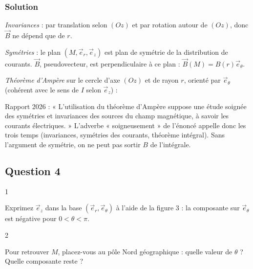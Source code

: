 \documentclass[11pt,a4paper]{article}
\newcommand{\equationajustee}[1]{%
  \sbox{\boiteequation}{$\displaystyle #1$}%
  \ifdim\wd\boiteequation>\linewidth
    \[\resizebox{\linewidth}{!}{\usebox{\boiteequation}}\]%
  \else
    \[#1\]%
  \fi}
\begin{document}
\hypertarget{solution-2}{%
\subsubsection{Solution}\label{solution-2}}

\emph{Invariances} : par translation selon \((Oz)\) et par rotation autour de \((Oz)\), donc \(\vec B\) ne dépend que de \(r\).

\emph{Symétries} : le plan \((M,\vec e_r,\vec e_z)\) est plan de symétrie de la distribution de courants. \(\vec B\), pseudovecteur, est perpendiculaire à ce plan : \(\vec B(M)=B(r)\vec e_\theta\).

\emph{Théorème d'Ampère} sur le cercle d'axe \((Oz)\) et de rayon \(r\), orienté par \(\vec e_\theta\) (cohérent avec le sens de \(I\) selon \(\vec e_z\)) :

\equationajustee{\oint\vec B\cdot\mathrm d\vec\ell=2\pi rB(r)=\mu_0I}

\equationajustee{\boxed{\vec B(M)=\frac{\mu_0I}{2\pi r}\,\vec e_\theta}}

\begin{jury}

Rapport 2026 : « L'utilisation du théorème d'Ampère suppose une étude soignée des symétries et invariances des sources du champ magnétique, à savoir les courants électriques. » L'adverbe « soigneusement » de l'énoncé appelle donc les trois temps (invariances, symétries des courants, théorème intégral). Sans l'argument de symétrie, on ne peut pas sortir \(B\) de l'intégrale.

\end{jury}

\hypertarget{question-4}{%
\subsection{Question 4}\label{question-4}}

\begin{indication}{1}

Exprimez \(\vec e_z\) dans la base \((\vec e_r,\vec e_\theta)\) à l'aide de la figure 3 : la composante sur \(\vec e_\theta\) est négative pour \(0<\theta<\pi\).

\end{indication}

\begin{indication}{2}

Pour retrouver \(M\), placez-vous au pôle Nord géographique : quelle valeur de \(\theta\) ? Quelle composante reste ?

\end{indication}
\end{document}
